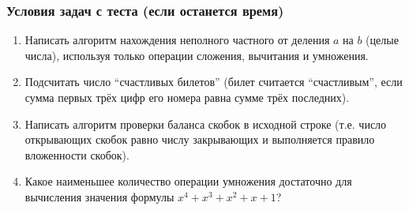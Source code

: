 \documentclass[aspectratio=169]{beamer}
\begin{document}
\appendix
\begin{frame}
    \frametitle{Условия задач с теста (если останется время)}
    \begin{enumerate}
        \item Написать алгоритм нахождения неполного частного от деления $a$ на $b$ (целые числа), используя только операции сложения, вычитания и умножения.
        \item Подсчитать число \enquote{счастливых билетов} (билет считается \enquote{счастливым}, если сумма первых трёх цифр его номера равна сумме трёх последних).
        \item Написать алгоритм проверки баланса скобок в исходной строке (т.е. число открывающих скобок равно числу закрывающих и выполняется правило вложенности скобок).
        \item Какое наименьшее количество операции умножения достаточно для вычисления значения формулы $x^4 + x^3 + x^2 + x + 1$?
    \end{enumerate}
\end{frame}
\end{document}
